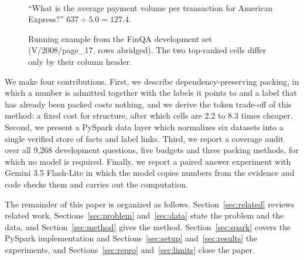 \documentclass[11pt]{article}
\begin{document}
\begin{figure}[t]
\centering
{}\\[2pt]
{\scriptsize ``What is the average payment volume per transaction for American Express?''
$637 \div 5.0 = 127.4$.}
\caption{Running example from the FinQA development set (V/2008/page\_17, rows
abridged). The two top-ranked cells differ only by their column header.}
\label{fig:example}
\end{figure}

We make four contributions. First, we describe dependency-preserving packing, in which
a number is admitted together with the labels it points to and a label that has already
been packed costs nothing, and we derive the token trade-off of this method: a fixed
cost for structure, after which cells are 2.2 to 8.3 times cheaper. Second, we
present a PySpark data layer which normalizes six datasets into a single verified store
of facts and label links. Third, we report a coverage audit over all 9,268 development
questions, five budgets and three packing methods, for which no model is required.
Finally, we report a paired answer experiment with Gemini 3.5 Flash-Lite in which the
model copies numbers from the evidence and code checks them and carries out the
computation.

The remainder of this paper is organized as follows. Section~\ref{sec:related} reviews
related work, Sections~\ref{sec:problem} and~\ref{sec:data} state the problem and the
data, and Section~\ref{sec:method} gives the method. Section~\ref{sec:spark} covers the
PySpark implementation and Sections~\ref{sec:setup} and~\ref{sec:results} the
experiments, and Sections~\ref{sec:repro} and~\ref{sec:limits} close the paper.
\end{document}
